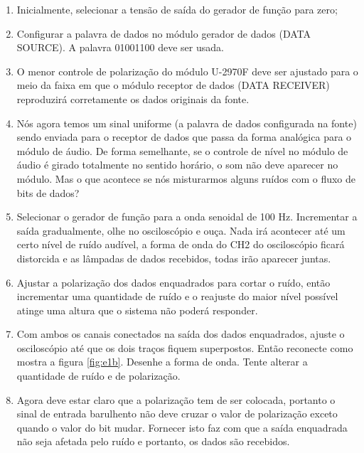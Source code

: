                 \begin{enumerate}
                    \item Inicialmente, selecionar a tensão de saída do gerador de função para zero;
                    
                    \item Configurar a palavra de dados no módulo gerador de dados (DATA SOURCE). A palavra 01001100 deve ser usada.
                    
                    \item O menor controle de polarização do módulo U-2970F deve ser ajustado para o meio da faixa em que o módulo receptor de dados (DATA RECEIVER) reproduzirá corretamente os dados originais da fonte.
                    
                    \item Nós agora temos um sinal uniforme (a palavra de dados configurada na fonte) sendo enviada para o receptor de dados que passa da forma analógica para o módulo de áudio. De forma semelhante, se o controle de nível no módulo de áudio é girado totalmente no sentido horário, o som não deve aparecer no módulo. Mas o que acontece se nós misturarmos alguns ruídos com o fluxo de bits de dados?
                    
                    \item Selecionar o gerador de função para a onda senoidal de 100 Hz. Incrementar a saída gradualmente, olhe no osciloscópio e ouça. Nada irá acontecer até um certo nível de ruído audível, a forma de onda do CH2 do osciloscópio ficará distorcida e as lâmpadas de dados recebidos, todas irão aparecer juntas.
                    
                    \item Ajustar a polarização dos dados enquadrados para cortar o ruído, então incrementar uma quantidade de ruído e o reajuste do maior nível possível atinge uma altura que o sistema não poderá responder.
                    
                    \item Com ambos os canais conectados na saída dos dados enquadrados, ajuste o osciloscópio até que os dois traços fiquem superpostos. Então reconecte como mostra a figura \ref{fig:e1b}. Desenhe a forma de onda. Tente alterar a quantidade de ruído e de polarização.
                    
                    \item Agora deve estar claro que a polarização tem de ser colocada, portanto o sinal de entrada barulhento não deve cruzar o valor de polarização exceto quando o valor do bit mudar. Fornecer isto faz com que a saída enquadrada não seja afetada pelo ruído e portanto, os dados são recebidos.
                \end{enumerate}
            
